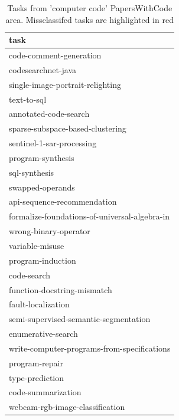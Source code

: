 \documentclass[longabstract,mgr,english]{iithesis}
\begin{document}
  \begin{table}[htbp]
\centering
\caption{Tasks from 'computer code' PapersWithCode area. Missclassifed tasks are
highlighted in red}
\begin{tabular}{|l|}
\hline
\toprule
                                          task \\
\hline

\midrule
                       code-comment-generation \\
                            codesearchnet-java \\
              {\color{red} single-image-portrait-relighting}\\
                                   text-to-sql \\
                         annotated-code-search \\
              {\color{red} sparse-subspace-based-clustering}\\
                     sentinel-1-sar-processing \\
                             program-synthesis \\
                                 sql-synthesis \\
                              swapped-operands \\
                   api-sequence-recommendation \\
 formalize-foundations-of-universal-algebra-in \\
                         wrong-binary-operator \\
                               variable-misuse \\
                             program-induction \\
                                   code-search \\
                   function-docstring-mismatch \\
                            fault-localization \\
         semi-supervised-semantic-segmentation \\
                            {\color{red} enumerative-search}\\
   write-computer-programs-from-specifications \\
                                program-repair \\
                               type-prediction \\
                            code-summarization \\
               {\color{red} webcam-rgb-image-classification}\\

\end{tabular}
\end{table}
\end{document}
